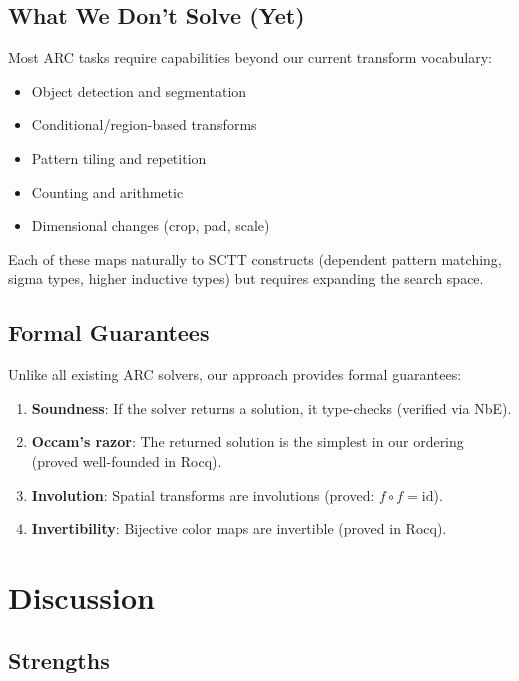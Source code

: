 \documentclass[11pt,a4paper]{article}
\begin{document}
\subsection{What We Don't Solve (Yet)}

Most ARC tasks require capabilities beyond our current transform
vocabulary:
\begin{itemize}[nosep]
  \item Object detection and segmentation
  \item Conditional/region-based transforms
  \item Pattern tiling and repetition
  \item Counting and arithmetic
  \item Dimensional changes (crop, pad, scale)
\end{itemize}

Each of these maps naturally to SCTT constructs (dependent pattern
matching, sigma types, higher inductive types) but requires expanding
the search space.

\subsection{Formal Guarantees}

Unlike all existing ARC solvers, our approach provides formal
guarantees:
\begin{enumerate}[nosep]
  \item \textbf{Soundness}: If the solver returns a solution, it
    type-checks (verified via NbE).
  \item \textbf{Occam's razor}: The returned solution is the simplest
    in our ordering (proved well-founded in Rocq).
  \item \textbf{Involution}: Spatial transforms are involutions
    (proved: $f \circ f = \mathrm{id}$).
  \item \textbf{Invertibility}: Bijective color maps are invertible
    (proved in Rocq).
\end{enumerate}

\section{Discussion}
\label{sec:discussion}

\subsection{Strengths}
\end{document}

